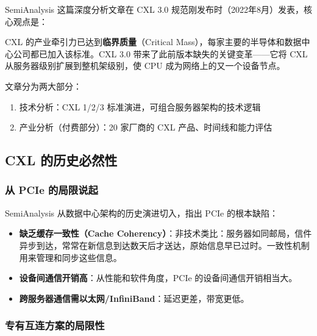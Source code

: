 \documentclass[12pt,a4paper]{article}
\begin{document}
SemiAnalysis 这篇深度分析文章在 CXL 3.0 规范刚发布时（2022年8月）发表，核心观点是：

\begin{keypoint}[核心论点]
CXL 的产业牵引力已达到\textbf{临界质量}（Critical Mass），每家主要的半导体和数据中心公司都已加入该标准。CXL 3.0 带来了此前版本缺失的关键变革——它将 CXL 从服务器级别扩展到整机架级别，使 CPU 成为网络上的又一个设备节点。
\end{keypoint}

文章分为两大部分：
\begin{enumerate}[label=(\arabic*)]
    \item 技术分析：CXL 1/2/3 标准演进，可组合服务器架构的技术逻辑
    \item 产业分析（付费部分）：20 家厂商的 CXL 产品、时间线和能力评估
\end{enumerate}

\subsection{CXL 的历史必然性}

\subsubsection{从 PCIe 的局限说起}

SemiAnalysis 从数据中心架构的历史演进切入，指出 PCIe 的根本缺陷：

\begin{keypoint}
\begin{itemize}
    \item \textbf{缺乏缓存一致性（Cache Coherency）}：非技术类比：服务器如同邮局，信件异步到达，常常在新信息到达数天后才送达，原始信息早已过时。一致性机制用来管理和同步这些信息。
    \item \textbf{设备间通信开销高}：从性能和软件角度，PCIe 的设备间通信开销相当大。
    \item \textbf{跨服务器通信需以太网/InfiniBand}：延迟更差，带宽更低。
\end{itemize}
\end{keypoint}

\subsubsection{专有互连方案的局限性}
\end{document}
